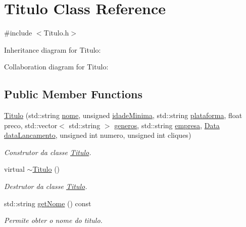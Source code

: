\hypertarget{class_titulo}{}\section{Titulo Class Reference}
\label{class_titulo}


{\ttfamily \#include $<$Titulo.\+h$>$}



Inheritance diagram for Titulo\+:


Collaboration diagram for Titulo\+:
\subsection*{Public Member Functions}
\begin{DoxyCompactItemize}
\item 
\mbox{\hyperlink{class_titulo_a898faeefdad15c64ae4cdc904a7e6f0e}{Titulo}} (std\+::string \mbox{\hyperlink{class_titulo_a8abdf1fc6d4fc14be20bbec247664d83}{nome}}, unsigned \mbox{\hyperlink{class_titulo_a28891078f53fc3317de60ae739514955}{idade\+Minima}}, std\+::string \mbox{\hyperlink{class_titulo_a67761eb7f006453ab0869e4b7c0a9c0b}{plataforma}}, float preco, std\+::vector$<$ std\+::string $>$ \mbox{\hyperlink{class_titulo_a3209265c8534416978ee9891b96c14b2}{generos}}, std\+::string \mbox{\hyperlink{class_titulo_a91510c440dc8583d60d88ea02f4eb1b6}{empresa}}, \mbox{\hyperlink{class_data}{Data}} \mbox{\hyperlink{class_titulo_ae540ddf2c607eb0e4de29eb8c0cca7f0}{data\+Lancamento}}, unsigned int numero, unsigned int cliques)
\begin{DoxyCompactList}\small\item\em Construtor da classe \mbox{\hyperlink{class_titulo}{Titulo}}. \end{DoxyCompactList}\item 
virtual \mbox{\hyperlink{class_titulo_a9b7513f1c255265a1d6ccff0ead30a8c}{$\sim$\+Titulo}} ()
\begin{DoxyCompactList}\small\item\em Destrutor da classe \mbox{\hyperlink{class_titulo}{Titulo}}. \end{DoxyCompactList}\item 
std\+::string \mbox{\hyperlink{class_titulo_acb79279860b3404c6419697df5f860cb}{get\+Nome}} () const
\begin{DoxyCompactList}\small\item\em Permite obter o nome do titulo. \end{DoxyCompactList}\item 

\end{DoxyCompactItemize}
